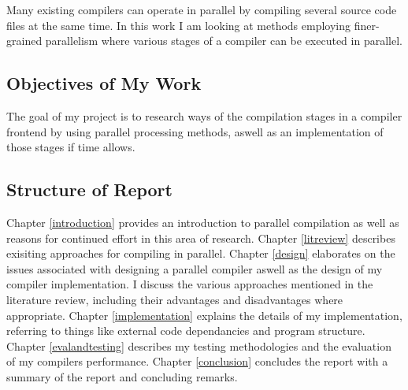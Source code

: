 Many existing compilers can operate in parallel by compiling several source
code files at the same time. In this work I am looking at methods employing
finer-grained parallelism where various stages of a compiler can be executed
in parallel.

\subsection{Objectives of My Work}

The goal of my project is to research ways of the compilation stages in
a compiler frontend by using parallel processing methods, aswell as an
implementation of those stages if time allows.

\subsection{Structure of Report}

Chapter \ref{introduction} provides an introduction to parallel compilation as
well as reasons for continued effort in this area of research.
\newline \newline
Chapter \ref{litreview} describes exisiting approaches for compiling
in parallel.
\newline \newline
Chapter \ref{design} elaborates on the issues associated with designing a
parallel compiler aswell as the design of my compiler implementation. I discuss
the various approaches mentioned in the literature review, including their
advantages and disadvantages where appropriate.
\newline \newline
Chapter \ref{implementation} explains the details of my implementation,
referring to things like external code dependancies and program structure.
\newline \newline
Chapter \ref{evalandtesting} describes my testing methodologies and the evaluation of my compilers performance.
\newline \newline
Chapter \ref{conclusion} concludes the report with a summary of the report and
concluding remarks.
